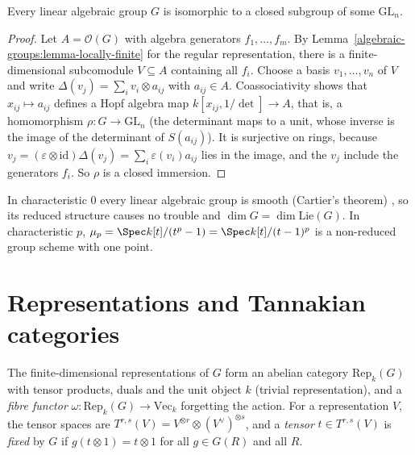 \begin{theorem}\label{algebraic-groups:theorem-linear}
Every linear algebraic group $G$ is isomorphic to a closed subgroup of some $\mathrm{GL}_n$.
\end{theorem}

\begin{proof}
Let $A = \mathcal{O}(G)$ with algebra generators $f_1, \ldots, f_m$. By Lemma~\ref{algebraic-groups:lemma-locally-finite} for the regular representation, there is a
finite-dimensional subcomodule $V \subseteq A$ containing all $f_i$. Choose a basis $v_1, \ldots, v_n$ of $V$ and write $\Delta(v_j) = \sum_iv_i \otimes a_{ij}$ with $a_{ij} \in A$.
Coassociativity shows that $x_{ij} \mapsto a_{ij}$ defines a Hopf algebra map $k[x_{ij}, 1/\det] \to A$, that is, a homomorphism $\rho \colon G \to \mathrm{GL}_n$ (the determinant maps
to a unit, whose inverse is the image of the determinant of $S(a_{ij})$). It is surjective on rings, because $v_j = (\varepsilon \otimes \mathrm{id})\Delta(v_j) = \sum_i\varepsilon(v_i)a_{ij}$ lies in
the image, and the $v_j$ include the generators $f_i$. So $\rho$ is a closed immersion.
\end{proof}

\begin{remark}\label{algebraic-groups:remark-smoothness}
In characteristic $0$ every linear algebraic group is smooth (Cartier's theorem) \cite{milne-algebraic-groups}, so its reduced structure causes no trouble and
$\dim G = \dim\mathrm{Lie}(G)$. In characteristic $p$, $\mu_p = \Spec k[t]/(t^p - 1) = \Spec k[t]/(t - 1)^p$ is a non-reduced group scheme with one point.
\end{remark}

\section{Representations and Tannakian categories}\label{algebraic-groups:section-tannakian}

\begin{definition}\label{algebraic-groups:definition-tensor-category}
The finite-dimensional representations of $G$ form an abelian category $\mathrm{Rep}_k(G)$ with tensor products, duals and the unit object $k$ (trivial representation), and
a \emph{fibre functor} $\omega \colon \mathrm{Rep}_k(G) \to \mathrm{Vec}_k$ forgetting the action. For a representation $V$, the tensor spaces are
$T^{r,s}(V) = V^{\otimes r} \otimes (V^\vee)^{\otimes s}$, and a \emph{tensor} $t \in T^{r,s}(V)$ is \emph{fixed} by $G$ if $g(t \otimes 1) = t \otimes 1$ for all $g \in G(R)$ and all $R$.
\end{definition}

